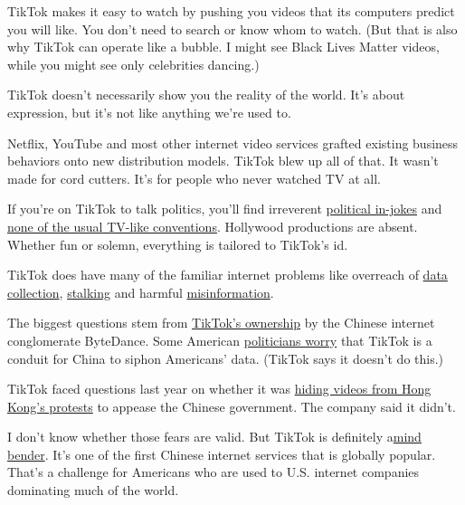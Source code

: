 TikTok makes it easy to watch by pushing you videos that its computers
predict you will like. You don't need to search or know whom to watch.
(But that is also why TikTok can operate like a bubble. I might see
Black Lives Matter videos, while you might see only celebrities
dancing.)

TikTok doesn't necessarily show you the reality of the world. It's about
expression, but it's not like anything we're used to.

Netflix, YouTube and most other internet video services grafted existing
business behaviors onto new distribution models. TikTok blew up all of
that. It wasn't made for cord cutters. It's for people who never watched
TV at all.

If you're on TikTok to talk politics, you'll find irreverent
\href{https://melmagazine.com/en-us/story/camp-pence-tiktok-memes-lgbtq-conversion-therapy}{political
in-jokes} and
\href{https://www.nytimes.com/2020/02/27/style/tiktok-politics-bernie-trump.html}{none
of the usual TV-like conventions}. Hollywood productions are absent.
Whether fun or solemn, everything is tailored to TikTok's id.

TikTok does have many of the familiar internet problems like overreach
of
\href{https://www.nytimes.com/2020/05/14/technology/tiktok-kids-privacy.html}{data
collection},
\href{https://www.latimes.com/local/lanow/la-me-ln-tik-tok-lewd-acts-arrest-20190214-story.html}{stalking}
and harmful
\href{https://www.mediamatters.org/fake-news/tiktok-hosting-videos-spreading-misinformation-about-coronavirus-despite-platforms-new}{misinformation}.

The biggest questions stem from
\href{https://www.nytimes.com/2019/11/18/technology/tiktok-alex-zhu-interview.html}{TikTok's
ownership} by the Chinese internet conglomerate ByteDance. Some American
\href{https://www.politico.com/newsletters/morning-tech/2020/05/28/house-democrats-join-gop-in-going-after-tiktok-787945}{politicians
worry} that TikTok is a conduit for China to siphon Americans' data.
(TikTok says it doesn't do this.)

TikTok faced questions last year on whether it was
\href{https://www.bloomberg.com/news/newsletters/2019-09-17/hong-kong-protests-raise-censorship-concerns-for-hot-app-tiktok?sref=7ooTCNG1}{hiding
videos from Hong Kong's protests} to appease the Chinese government. The
company said it didn't.

I don't know whether those fears are valid. But TikTok is definitely
a\href{https://www.nytimes.com/2019/11/05/business/tiktok-china-bytedance.html}{mind
bender}. It's one of the first Chinese internet services that is
globally popular. That's a challenge for Americans who are used to U.S.
internet companies dominating much of the world.

